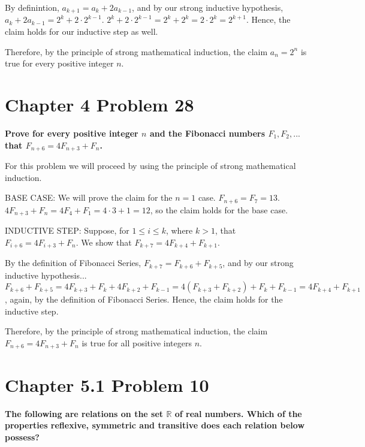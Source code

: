 \documentclass[10pt]{article}
\def \n {\par \vspace{\baselineskip}}
\begin{document}
\n By definintion, $a_{k + 1} = a_k + 2a_{k - 1}$, and by our strong inductive hypothesis, $a_k + 2a_{k - 1} = 2^k + 2 \cdot 2^{k - 1}$.
$2^k + 2 \cdot 2^{k - 1} = 2^k + 2^k = 2 \cdot 2^k = 2^{k + 1}$.
Hence, the claim holds for our inductive step as well.

\n Therefore, by the principle of strong mathematical induction, the claim $a_n = 2^n$ is true for every positive integer $n$.


\n\n\n\n
\section{Chapter 4 Problem 28}
\textbf{Prove for every positive integer $n$ and the Fibonacci numbers $F_1, F_2, ...$ that $F_{n+6} = 4F_{n+3} + F_n$.}

For this problem we will proceed by using the principle of strong mathematical induction. 

\n BASE CASE: We will prove the claim for the $n = 1$ case.  $F_{n + 6} = F_{7} = 13$.  $4F_{n + 3} + F_n = 4F_4 + F_1
= 4 \cdot 3 + 1 = 12$, so the claim holds for the base case.

\n INDUCTIVE STEP: Suppose, for $1 \leq i \leq k$, where $k > 1$, that $F_{i+6} = 4F_{i+3} + F_n$.  We show that
$F_{k+7} = 4F_{k+4} + F_{k+1}$.

\n By the definition of Fibonacci Series, $F_{k+7} = F_{k+6} + F_{k+5}$, and by our strong inductive hypothesis... 
$F_{k+6} + F_{k+5} = 4F_{k+3} + F_k + 4F_{k+2} + F_{k-1} = 4(F_{k+3} + F_{k+2}) + F_k + F_{k-1} = 4F_{k+4} + F_{k+1}$, again,
by the definition of Fibonacci Series.  Hence, the claim holds for the inductive step.

\n Therefore, by the principle of strong mathematical induction, the claim $F_{n+6} = 4F_{n+3} + F_n$ is true for all positive integers $n$.


\section{Chapter 5.1 Problem 10}
\textbf{The following are relations on the set $\mathbb{R}$ of real numbers.  Which of the properties reflexive, symmetric
and transitive does each relation below possess?}
\end{document}
